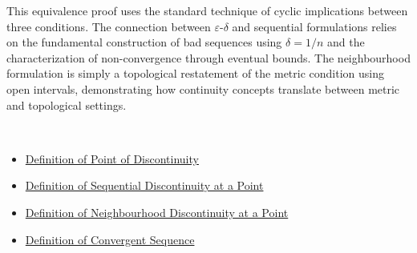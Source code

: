 \begin{remark*}
This equivalence proof uses the standard technique of cyclic implications between three conditions. The connection between $\varepsilon$-$\delta$ and sequential formulations relies on the fundamental construction of bad sequences using $\delta=1/n$ and the characterization of non-convergence through eventual bounds. The neighbourhood formulation is simply a topological restatement of the metric condition using open intervals, demonstrating how continuity concepts translate between metric and topological settings.
\end{remark*}

\begin{remark*}[Dependencies]~\\
\begin{itemize}
  \item \hyperref[def:point-of-discontinuity]{Definition of Point of Discontinuity}
  \item \hyperref[def:sequential-discontinuity-at-a-point]{Definition of Sequential Discontinuity at a Point}
  \item \hyperref[def:neighborhood-discontinuity-at-a-point]{Definition of Neighbourhood Discontinuity at a Point}
  \item \hyperref[def:convergent-sequence]{Definition of Convergent Sequence}
\end{itemize}
\end{remark*}
